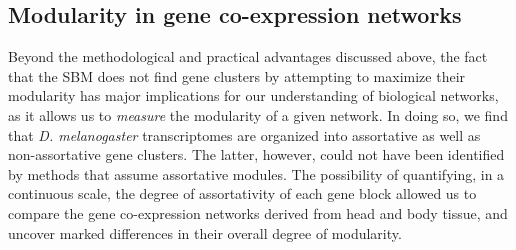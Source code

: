 \documentclass[
]{article}
\begin{document}
\subsection{Modularity in gene co-expression
networks}\label{modularity-in-gene-co-expression-networks}

Beyond the methodological and practical advantages discussed above, the
fact that the SBM does not find gene clusters by attempting to maximize
their modularity has major implications for our understanding of
biological networks, as it allows us to \emph{measure} the modularity of
a given network. In doing so, we find that \emph{D. melanogaster}
transcriptomes are organized into assortative as well as non-assortative
gene clusters. The latter, however, could not have been identified by
methods that assume assortative modules. The possibility of quantifying,
in a continuous scale, the degree of assortativity of each gene block
allowed us to compare the gene co-expression networks derived from head
and body tissue, and uncover marked differences in their overall degree
of modularity.
\end{document}
